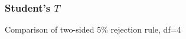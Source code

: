 \documentclass[handout]{beamer}
\begin{document}


   \begin{frame}
   \frametitle{Student's $T$}
   \begin{center}
   \end{center}
   Comparison of two-sided {\color{blue} 5\% rejection rule}, df=4
   \end{frame}

\end{document}
